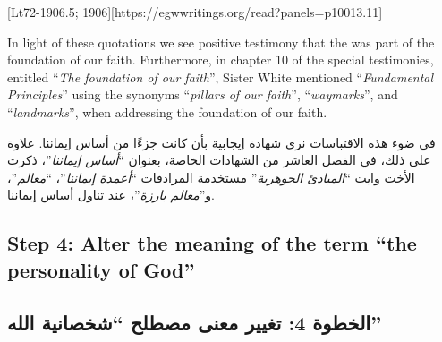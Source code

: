 [Lt72-1906.5; 1906][https://egwwritings.org/read?panels=p10013.11]


In light of these quotations we see positive testimony that the  was part of the foundation of our faith. Furthermore, in chapter 10 of the special testimonies, entitled “\textit{The foundation of our faith}”, Sister White mentioned “\textit{Fundamental Principles}” using the synonyms “\textit{pillars of our faith}”, “\textit{waymarks}”, and “\textit{landmarks}”, when addressing the foundation of our faith.


في ضوء هذه الاقتباسات نرى شهادة إيجابية بأن  كانت جزءًا من أساس إيماننا. علاوة على ذلك، في الفصل العاشر من الشهادات الخاصة، بعنوان “\textit{أساس إيماننا}”، ذكرت الأخت وايت “\textit{المبادئ الجوهرية}” مستخدمة المرادفات “\textit{أعمدة إيماننا}”، “\textit{معالم}”، و”\textit{معالم بارزة}”، عند تناول أساس إيماننا.


\subsection*{Step 4: Alter the meaning of the term “the personality of God”}


\subsection*{الخطوة 4: تغيير معنى مصطلح “شخصانية الله”}


